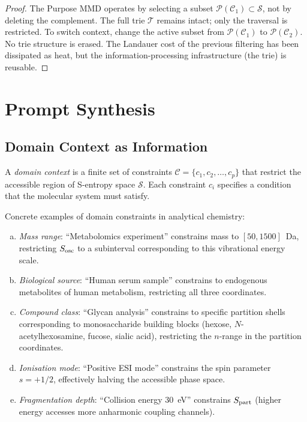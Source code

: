 \begin{proof}
The Purpose MMD operates by selecting a subset $\mathcal{P}(\mathcal{C}_1)
\subset \mathcal{S}$, not by deleting the complement.  The full trie
$\mathcal{T}$ remains intact; only the traversal is restricted.  To switch
context, change the active subset from $\mathcal{P}(\mathcal{C}_1)$ to
$\mathcal{P}(\mathcal{C}_2)$.  No trie structure is erased.  The Landauer
cost of the previous filtering has been dissipated as heat, but the
information-processing infrastructure (the trie) is reusable.
\end{proof}

\section{Prompt Synthesis}
\label{sec:ch24-prompt}

\subsection{Domain Context as Information}
\label{sec:ch24-context}

\begin{definition}
\label{def:ch24-context}
A \emph{domain context} is a finite set of constraints
$\mathcal{C} = \{c_1, c_2, \ldots, c_p\}$ that restrict the accessible region
of S-entropy space $\mathcal{S}$.  Each constraint $c_i$ specifies a condition
that the molecular system must satisfy.
\end{definition}

Concrete examples of domain constraints in analytical chemistry:
\begin{enumerate}[(a)]
  \item \emph{Mass range}: ``Metabolomics experiment'' constrains mass
    to $[50, 1500]$~Da, restricting $S_{\mathrm{osc}}$ to a subinterval corresponding
    to this vibrational energy scale.
  \item \emph{Biological source}: ``Human serum sample'' constrains to
    endogenous metabolites of human metabolism, restricting all three
    coordinates.
  \item \emph{Compound class}: ``Glycan analysis'' constrains to specific
    partition shells corresponding to monosaccharide building blocks (hexose,
    $N$-acetylhexosamine, fucose, sialic acid), restricting the $n$-range
    in the partition coordinates.
  \item \emph{Ionisation mode}: ``Positive ESI mode'' constrains the spin
    parameter $s = +1/2$, effectively halving the accessible phase space.
  \item \emph{Fragmentation depth}: ``Collision energy 30~eV'' constrains
    $S_{\mathrm{part}}$ (higher energy accesses more anharmonic coupling channels).
\end{enumerate}

